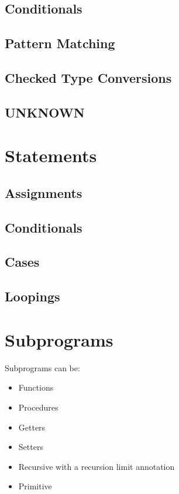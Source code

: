 \documentclass{book}
\begin{document}
\section{Conditionals}

\section{Pattern Matching}

\section{Checked Type Conversions}

\section{UNKNOWN}

\chapter{Statements}

\section{Assignments}

\section{Conditionals}

\section{Cases}

\section{Loopings}

\chapter{Subprograms}

Subprograms can be:
\begin{itemize}
    \item Functions
    \item Procedures
    \item Getters
    \item Setters
    \item Recursive with a recursion limit annotation
    \item Primitive
\end{itemize}
\end{document}
